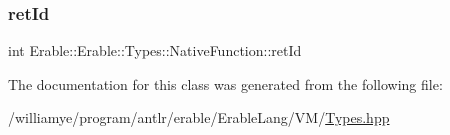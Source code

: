 \subsubsection{\texorpdfstring{retId}{retId}}
{\footnotesize\ttfamily int Erable\+::\+Erable\+::\+Types\+::\+Native\+Function\+::ret\+Id\hspace{0.3cm}{\ttfamily [private]}}



The documentation for this class was generated from the following file\+:\begin{DoxyCompactItemize}
\item 
/williamye/program/antlr/erable/\+Erable\+Lang/\+V\+M/\mbox{\hyperlink{_types_8hpp}{Types.\+hpp}}\end{DoxyCompactItemize}
